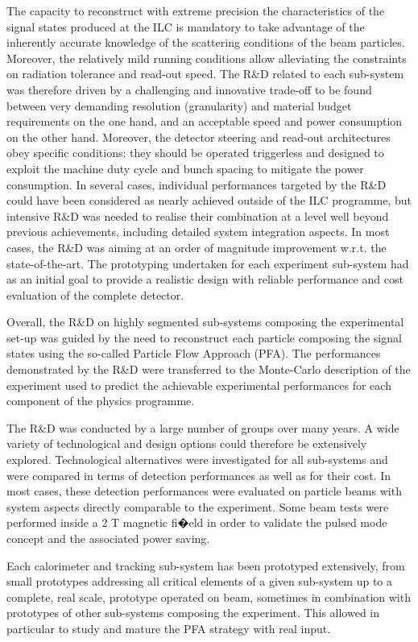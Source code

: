 \documentclass[%
 reprint,
 amsmath,amssymb,
 aps,
]{revtex4-1}
\begin{document}
The capacity to reconstruct with extreme precision the characteristics of the signal states produced at the ILC is mandatory to take advantage of the inherently accurate knowledge of the scattering conditions of the beam particles. Moreover, the relatively mild running conditions allow alleviating the constraints on radiation tolerance and read-out speed. The R\&D related to each sub-system was therefore driven by a challenging and innovative trade-off to be found between very demanding resolution (granularity) and material budget requirements on the one hand, and an acceptable speed and power consumption on the other hand. Moreover, the detector steering and read-out architectures obey specific conditions: they should be operated triggerless and designed to exploit the machine duty cycle and bunch spacing to mitigate the power consumption.
In several cases, individual performances targeted by the R\&D could have been considered as nearly achieved outside of the ILC programme, but intensive R\&D was needed to realise their combination at a level well beyond previous achievements, including detailed system integration aspects. In most cases, the R\&D was aiming at an order of magnitude improvement w.r.t. the state-of-the-art. The prototyping undertaken for each experiment sub-system had as an initial goal to provide a realistic design with reliable performance and cost evaluation of the complete detector.

Overall, the R\&D on highly segmented sub-systems composing the experimental set-up was guided by the need to reconstruct each particle composing the signal states using the so-called Particle Flow Approach (PFA). The performances demonstrated by the R\&D were transferred to the Monte-Carlo description of the experiment used to predict the achievable experimental performances for each component of the physics programme.

The R\&D was conducted by a large number of groups over many years. A wide variety of technological and design options could therefore be extensively explored. Technological alternatives were investigated for all sub-systems and were compared in terms of detection performances as well as for their cost. In most cases, these detection performances were evaluated on particle beams with system aspects directly comparable to the experiment. Some beam tests were performed inside a 2 T magnetic fi�eld in order to validate the pulsed mode concept and the associated power saving.

Each calorimeter and tracking sub-system has been prototyped extensively, from small prototypes addressing all critical elements of a given sub-system up to a complete, real scale, prototype operated on beam, sometimes in combination with prototypes of other sub-systems composing the experiment. This allowed in particular to study and mature the PFA strategy with real input.
\end{document}

